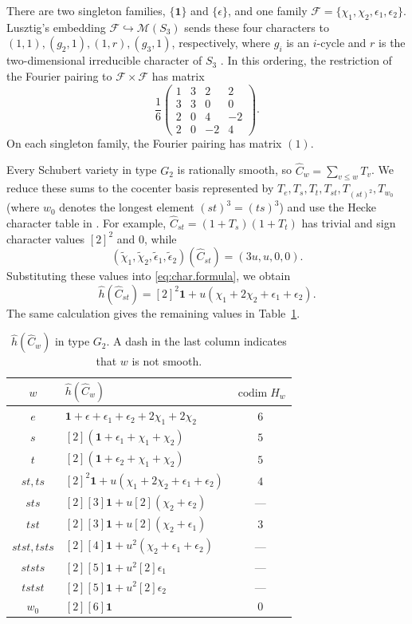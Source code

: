 \documentclass[11pt]{amsart}
\numberwithin{equation}{section}
\theoremstyle{definition}
\DeclareMathOperator{\codim}{\mathrm{codim}}
\begin{document}
There are two singleton families, $\{\mathbf1\}$ and $\{\epsilon\}$, and one family $\mathscr F=\{\chi_1,\chi_2,\epsilon_1,\epsilon_2\}$.
Lusztig's embedding $\mathscr F\hookrightarrow\mathscr M(S_3)$ sends these four characters to $(1,1),(g_2,1),(1,r),(g_3,1)$, respectively, where $g_i$ is an $i$-cycle and $r$ is the two-dimensional irreducible character of $S_3$ \cite[p.~95]{Lus84}.
In this ordering, the restriction of the Fourier pairing to $\mathscr F\times\mathscr F$ has matrix \cite[p.~110]{Lus84}
\[
\frac16
\begin{pmatrix}
1&3&2&2\\
3&3&0&0\\
2&0&4&-2\\
2&0&-2&4
\end{pmatrix}.
\]
On each singleton family, the Fourier pairing has matrix $(1)$.

Every Schubert variety in type $G_2$ is rationally smooth, so $\widehat C_w=\sum_{v\leq w}T_v$.
We reduce these sums to the cocenter basis represented by $T_e,T_s,T_t,T_{st},T_{(st)^2},T_{w_0}$ (where $w_0$ denotes the longest element $(st)^3=(ts)^3$) and use the Hecke character table in \cite[p.~270]{GP}.
For example, $\widehat C_{st}=(1+T_s)(1+T_t)$ has trivial and sign character values $[2]^2$ and $0$, while
\[
(\widetilde\chi_1,\widetilde\chi_2,
 \widetilde\epsilon_1,\widetilde\epsilon_2)(\widehat C_{st})
=(3u,u,0,0).
\]
Substituting these values into \eqref{eq:char.formula}, we obtain
\[
\widehat h(\widehat C_{st})
=[2]^2\mathbf1+u(\chi_1+2\chi_2+\epsilon_1+\epsilon_2).
\]
The same calculation gives the remaining values in Table~\ref{tab:G2}.

\begin{table}[htbp]
\centering
\renewcommand{\arraystretch}{1.18}
\begin{tabular}{@{}clc@{}}
\toprule
$w$ & $\widehat h(\widehat C_w)$ & $\codim H_w$\\
\midrule
$e$ & $\mathbf1+\epsilon+\epsilon_1+\epsilon_2+2\chi_1+2\chi_2$ & $6$\\
$s$ & $[2](\mathbf1+\epsilon_1+\chi_1+\chi_2)$ & $5$\\
$t$ & $[2](\mathbf1+\epsilon_2+\chi_1+\chi_2)$ & $5$\\
$st,ts$ & $[2]^2\mathbf1+u(\chi_1+2\chi_2+\epsilon_1+\epsilon_2)$ & $4$\\
$sts$ & $[2][3]\mathbf1+u[2](\chi_2+\epsilon_2)$ & ---\\
$tst$ & $[2][3]\mathbf1+u[2](\chi_2+\epsilon_1)$ & $3$\\
$stst,tsts$ & $[2][4]\mathbf1+u^2(\chi_2+\epsilon_1+\epsilon_2)$ & ---\\
$ststs$ & $[2][5]\mathbf1+u^2[2]\epsilon_1$ & ---\\
$tstst$ & $[2][5]\mathbf1+u^2[2]\epsilon_2$ & ---\\
$w_0$ & $[2][6]\mathbf1$ & $0$\\
\bottomrule
\end{tabular}
\par
\vspace{8pt}
\caption{$\widehat h(\widehat C_w)$ in type $G_2$.
A dash in the last column indicates that $w$ is not smooth.}
\label{tab:G2}
\end{table}
\end{document}
